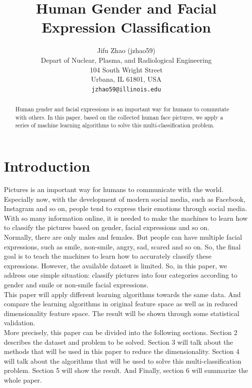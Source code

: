 \documentclass[11pt,letterpaper]{article}
\title{Human Gender and Facial Expression Classification}
\author{Jifu Zhao (jzhao59)\\
	    Depart of Nuclear, Plasma, and Radiological Engineering\\
	    104 South Wright Street\\
	    Urbana, IL 61801, USA\\
	    {\tt jzhao59@illinois.edu}}
\date{}
\begin{document}
\maketitle

\begin{abstract}
Human gender and facial expressions is an important way for humans to commutate with others. In this paper, based on the collected human face pictures, we apply a series of machine learning algorithms to solve this multi-classification problem.
\end{abstract}

\section{Introduction}

Pictures is an important way for humans to communicate with the world. Especially now, with the development of modern social media, such as Facebook, Instagram and so on, people tend to express their emotions through social media. With so many information online, it is needed to make the machines to learn how to classify the pictures based on gender, facial expressions and so on.\\

Normally, there are only males and females. But people can have multiple facial expressions, such as smile, non-smile, angry, sad, scared and so on. So, the final goal is to teach the machines to learn how to accurately classify these expressions. However, the available dataset is limited. So, in this paper, we address one simple situation: classify pictures into four categories according to gender and smile or non-smile facial expressions.\\

This paper will apply different learning algorithms towards the same data. And compare the learning algorithms in original feature space as well as in reduced dimensionality feature space. The result will be shown through some statistical validation.\\

More precisely, this paper can be divided into the following sections. Section 2 describes the dataset and problem to be solved. Section 3 will talk about the methods that will be used in this paper to reduce the dimensionality. Section 4 will talk about the algorithms that will be used to solve this multi-classification problem. Section 5 will show the result. And Finally, section 6 will summarize the whole paper.\\
\end{document}
